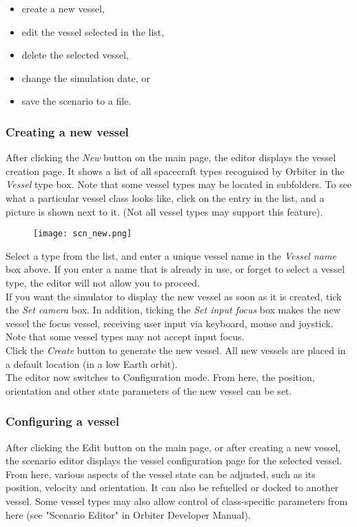 \documentclass[Orbiter User Manual.tex]{subfiles}
\begin{document}
\begin{itemize}
\item create a new vessel,
\item edit the vessel selected in the list,
\item delete the selected vessel,
\item change the simulation date, or
\item save the scenario to a file.
\end{itemize}


\subsubsection{Creating a new vessel}
After clicking the \textit{New} button on the main page, the editor displays the vessel creation page. It shows a list of all spacecraft types recognised by Orbiter in the \textit{Vessel} type box. Note that some vessel types may be located in subfolders. To see what a particular vessel class looks like, click on the entry in the list, and a picture is shown next to it. (Not all vessel types may support this feature).

\begin{figure}[H]
	\centering
	\texttt{[image: scn\_new.png]}
\end{figure}

\noindent
Select a type from the list, and enter a unique vessel name in the \textit{Vessel name} box above. If you enter a name that is already in use, or forget to select a vessel type, the editor will not allow you to proceed.\\
If you want the simulator to display the new vessel as soon as it is created, tick the \textit{Set camera} box. In addition, ticking the \textit{Set input focus} box makes the new vessel the focus vessel, receiving user input via keyboard, mouse and joystick. Note that some vessel types may not accept input focus.\\
Click the \textit{Create} button to generate the new vessel. All new vessels are placed in a default location (in a low Earth orbit).\\
The editor now switches to Configuration mode. From here, the position, orientation and other state parameters of the new vessel can be set.


\subsubsection{Configuring a vessel}
After clicking the Edit button on the main page, or after creating a new vessel, the scenario editor displays the vessel configuration page for the selected vessel. From here, various aspects of the vessel state can be adjusted, such as its position, velocity and orientation. It can also be refuelled or docked to another vessel. Some vessel types may also allow control of class-specific parameters from here (see "Scenario Editor" in Orbiter Developer Manual).\\
\end{document}
